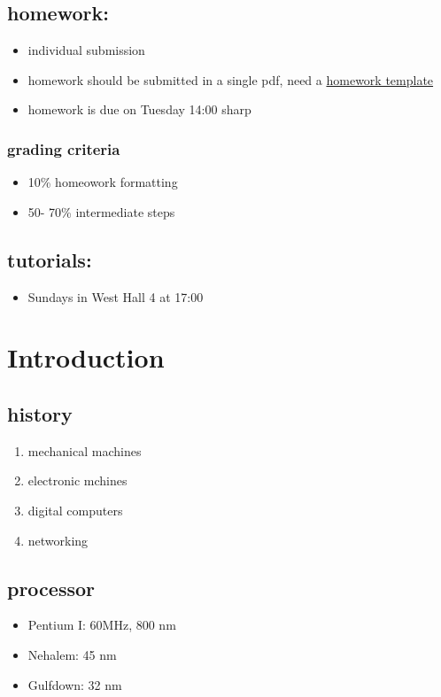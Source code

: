 \documentclass[11pt]{article}
\begin{document}
\subsection{homework:}
\label{sec:orgc72b31f}
\begin{itemize}
\item individual submission
\item homework should be submitted in a single pdf, need a \href{https://grader.eecs.jacobs-university.de/courses/320241/2018\_2/lectures/template\_hw.tex}{homework template}
\item homework is due on Tuesday 14:00 sharp
\end{itemize}
\subsubsection{grading criteria}
\label{sec:org964fc9d}
\begin{itemize}
\item 10\% homeowork formatting
\item 50- 70\% intermediate steps
\end{itemize}
\subsection{tutorials:}
\label{sec:orga23d9b4}
\begin{itemize}
\item Sundays in West Hall 4 at 17:00
\end{itemize}
\section{Introduction}
\label{sec:org433aa70}
\subsection{history}
\label{sec:org092c7a2}
\begin{enumerate}
\item mechanical machines
\item electronic mchines
\item digital computers
\item networking
\end{enumerate}
\subsection{processor}
\label{sec:orgc0fcbcc}
\begin{itemize}
\item Pentium I: 60MHz, 800 nm
\item Nehalem: 45 nm
\item Gulfdown: 32 nm
\end{itemize}
\end{document}

